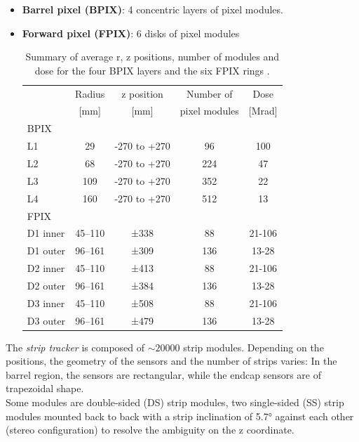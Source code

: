 \begin{itemize}
    \item \textbf{Barrel pixel (BPIX)}: 4 concentric layers of pixel modules.
    \item \textbf{Forward pixel (FPIX)}: 6 disks of pixel modules
    \begin{table}[h!]
        \centering
        \begin{tabular}{l|c|c|c|c}
            & Radius & z position & Number of & Dose \\
            & [mm]   &  [mm]    &  pixel modules & [Mrad]\\
            \hline
            BPIX & \multicolumn{4}{c}{ } \\
            \hline
            L1&29&-270 to +270&96& 100 \\
            L2&68&-270 to +270&224& 47\\
            L3&109&-270 to +270&352& 22\\
            L4&160&-270 to +270&512& 13 \\
            \hline
            FPIX & \multicolumn{4}{c}{ } \\
            \hline
            D1 inner&45–110&±338&88 & 21-106\\
            D1 outer&96–161&±309&136 & 13-28\\
            D2 inner&45–110&±413&88 & 21-106\\
            D2 outer&96–161&±384&136 & 13-28\\
            D3 inner&45–110&±508&88 & 21-106\\
            D3 outer&96–161&±479&136 & 13-28\\
        \end{tabular}
        \caption{Summary of average r, z positions, number of modules and dose for the four BPIX layers and
the six FPIX rings \cite{Adam2021TheUpgrade}.}
        \label{tab:pixel_tracker}
    \end{table}
\end{itemize}
The \emph{strip tracker} \cite{Friedl2001TheReadout} is composed of  $\sim 20000$ strip modules. Depending on the positions, the geometry of the sensors and the number of strips varies: In the barrel region, the sensors are rectangular, while the endcap sensors are of trapezoidal shape.\\
Some modules are double-sided (DS) strip modules, \ie two single-sided (SS) strip modules mounted back to back with a strip inclination of 5.7° against each other (stereo configuration) to resolve the ambiguity on the z coordinate.


